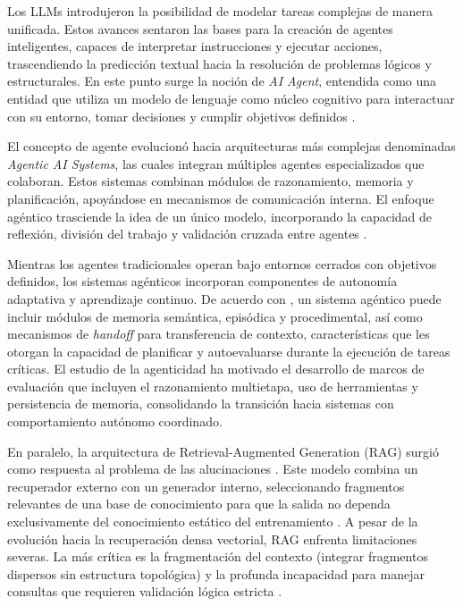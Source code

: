 \documentclass[12pt,letterpaper]{article}
\begin{document}
Los LLMs introdujeron la posibilidad de modelar tareas complejas de manera unificada. Estos avances sentaron las bases para la creación de agentes inteligentes, capaces de interpretar instrucciones y ejecutar acciones, trascendiendo la predicción textual hacia la resolución de problemas lógicos y estructurales. En este punto surge la noción de \textit{AI Agent}, entendida como una entidad que utiliza un modelo de lenguaje como núcleo cognitivo para interactuar con su entorno, tomar decisiones y cumplir objetivos definidos \citep{Acharya2025}.

El concepto de agente evolucionó hacia arquitecturas más complejas denominadas \textit{Agentic AI Systems}, las cuales integran múltiples agentes especializados que colaboran. Estos sistemas combinan módulos de razonamiento, memoria y planificación, apoyándose en mecanismos de comunicación interna. El enfoque agéntico trasciende la idea de un único modelo, incorporando la capacidad de reflexión, división del trabajo y validación cruzada entre agentes \citep{Khamis2025}.

Mientras los agentes tradicionales operan bajo entornos cerrados con objetivos definidos, los sistemas agénticos incorporan componentes de autonomía adaptativa y aprendizaje continuo. De acuerdo con \cite{Khamis2025}, un sistema agéntico puede incluir módulos de memoria semántica, episódica y procedimental, así como mecanismos de \textit{handoff} para transferencia de contexto, características que les otorgan la capacidad de planificar y autoevaluarse durante la ejecución de tareas críticas. El estudio de la agenticidad ha motivado el desarrollo de marcos de evaluación \citep{Asaf2025} que incluyen el razonamiento multietapa, uso de herramientas y persistencia de memoria, consolidando la transición hacia sistemas con comportamiento autónomo coordinado.

En paralelo, la arquitectura de Retrieval-Augmented Generation \citep{Lewis2021} (RAG) surgió como respuesta al problema de las alucinaciones \citep{Xi2023}. Este modelo combina un recuperador externo con un generador interno, seleccionando fragmentos relevantes de una base de conocimiento para que la salida no dependa exclusivamente del conocimiento estático del entrenamiento \citep{Singh2025}. A pesar de la evolución hacia la recuperación densa vectorial, RAG enfrenta limitaciones severas. La más crítica es la fragmentación del contexto (integrar fragmentos dispersos sin estructura topológica) y la profunda incapacidad para manejar consultas que requieren validación lógica estricta \citep{Singh2025}.
\end{document}
